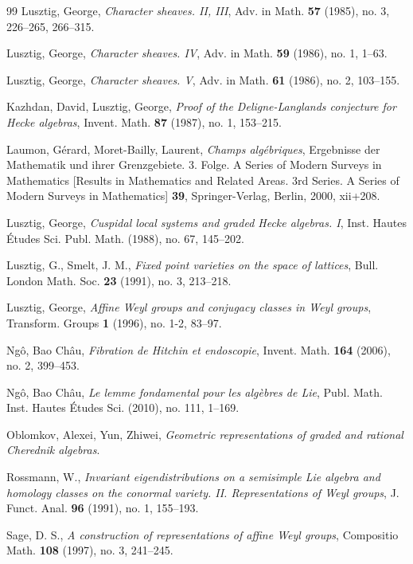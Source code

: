 \begin{thebibliography}{99}
 Lusztig, George, \emph{Character sheaves. II, III}, Adv. in Math. \textbf{57} (1985), no. 3, 226--265, 266--315.

 Lusztig, George, \emph{Character sheaves. IV}, Adv. in Math. \textbf{59} (1986), no. 1, 1--63.

 Lusztig, George, \emph{Character sheaves. V}, Adv. in Math. \textbf{61} (1986), no. 2, 103--155.

 Kazhdan, David, Lusztig, George, \emph{Proof of the Deligne-Langlands conjecture for Hecke algebras}, Invent. Math. \textbf{87} (1987), no. 1, 153--215.

 Laumon, G{\'e}rard, Moret-Bailly, Laurent, \emph{Champs alg\'ebriques}, Ergebnisse der Mathematik und ihrer Grenzgebiete. 3. Folge. A Series of Modern Surveys in Mathematics [Results in Mathematics and Related Areas. 3rd Series. A Series of Modern Surveys in Mathematics] \textbf{39}, Springer-Verlag, Berlin, 2000, xii+208.

 Lusztig, George, \emph{Cuspidal local systems and graded Hecke algebras. I}, Inst. Hautes \'Etudes Sci. Publ. Math. (1988), no. 67, 145--202.

 Lusztig, G., Smelt, J. M., \emph{Fixed point varieties on the space of lattices}, Bull. London Math. Soc. \textbf{23} (1991), no. 3, 213--218.

 Lusztig, George, \emph{Affine Weyl groups and conjugacy classes in Weyl groups}, Transform. Groups \textbf{1} (1996), no. 1-2, 83--97.

 Ng{\^o}, Bao Ch{\^a}u, \emph{Fibration de Hitchin et endoscopie}, Invent. Math. \textbf{164} (2006), no. 2, 399--453.

 Ng{\^o}, Bao Ch{\^a}u, \emph{Le lemme fondamental pour les alg\`ebres de Lie}, Publ. Math. Inst. Hautes \'Etudes Sci. (2010), no. 111, 1--169.

 Oblomkov, Alexei, Yun, Zhiwei, \emph{Geometric representations of graded and rational Cherednik algebras}.

 Rossmann, W., \emph{Invariant eigendistributions on a semisimple Lie algebra and homology classes on the conormal variety. II. Representations of Weyl groups}, J. Funct. Anal. \textbf{96} (1991), no. 1, 155--193.

 Sage, D. S., \emph{A construction of representations of affine Weyl groups}, Compositio Math. \textbf{108} (1997), no. 3, 241--245.


\end{thebibliography}
